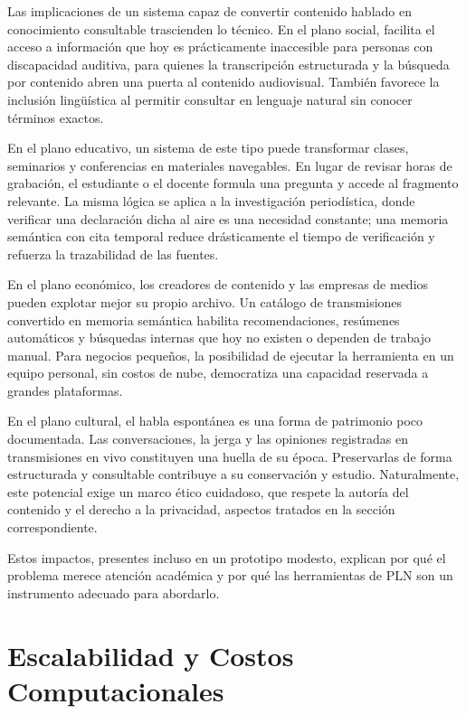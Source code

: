 \documentclass[12pt,a4paper]{article}
\begin{document}
Las implicaciones de un sistema capaz de convertir contenido hablado en conocimiento consultable trascienden lo técnico. En el plano social, facilita el acceso a información que hoy es prácticamente inaccesible para personas con discapacidad auditiva, para quienes la transcripción estructurada y la búsqueda por contenido abren una puerta al contenido audiovisual. También favorece la inclusión lingüística al permitir consultar en lenguaje natural sin conocer términos exactos.

En el plano educativo, un sistema de este tipo puede transformar clases, seminarios y conferencias en materiales navegables. En lugar de revisar horas de grabación, el estudiante o el docente formula una pregunta y accede al fragmento relevante. La misma lógica se aplica a la investigación periodística, donde verificar una declaración dicha al aire es una necesidad constante; una memoria semántica con cita temporal reduce drásticamente el tiempo de verificación y refuerza la trazabilidad de las fuentes.

En el plano económico, los creadores de contenido y las empresas de medios pueden explotar mejor su propio archivo. Un catálogo de transmisiones convertido en memoria semántica habilita recomendaciones, resúmenes automáticos y búsquedas internas que hoy no existen o dependen de trabajo manual. Para negocios pequeños, la posibilidad de ejecutar la herramienta en un equipo personal, sin costos de nube, democratiza una capacidad reservada a grandes plataformas.

En el plano cultural, el habla espontánea es una forma de patrimonio poco documentada. Las conversaciones, la jerga y las opiniones registradas en transmisiones en vivo constituyen una huella de su época. Preservarlas de forma estructurada y consultable contribuye a su conservación y estudio. Naturalmente, este potencial exige un marco ético cuidadoso, que respete la autoría del contenido y el derecho a la privacidad, aspectos tratados en la sección correspondiente.

Estos impactos, presentes incluso en un prototipo modesto, explican por qué el problema merece atención académica y por qué las herramientas de PLN son un instrumento adecuado para abordarlo.



\section{Escalabilidad y Costos Computacionales}
\label{sec:escalabilidad}
\end{document}
